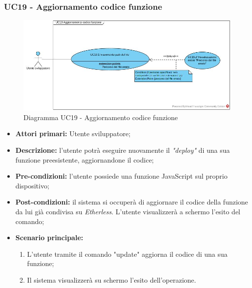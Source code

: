 \subsubsection{UC19 - Aggiornamento codice funzione}
\begin{figure}[h]
	\centering
	\includegraphics[width=\linewidth]{res/img/UC19.jpg}
	\caption{Diagramma UC19 - Aggiornamento codice funzione}
\end{figure}
\begin{itemize}
	\item \textbf{Attori primari:} Utente sviluppatore;
	\item \textbf{Descrizione:} l'utente potrà eseguire nuovamente il \textit{"deploy\glos"} di una sua funzione preesistente, aggiornandone il codice; 
	\item \textbf{Pre-condizioni:} l'utente possiede una funzione JavaScript sul proprio dispositivo;
	\item \textbf{Post-condizioni:} il sistema si occuperà di aggiornare il codice della funzione da lui già condivisa su \textit{Etherless}. L'utente visualizzerà a schermo l'esito del comando;
	\item \textbf{Scenario principale:} 
	\begin{enumerate}
		\item L'utente tramite il comando "update" aggiorna il codice di una sua funzione;
		\item Il sistema visualizzerà su schermo l'esito dell'operazione.
	\end{enumerate}
\end{itemize}